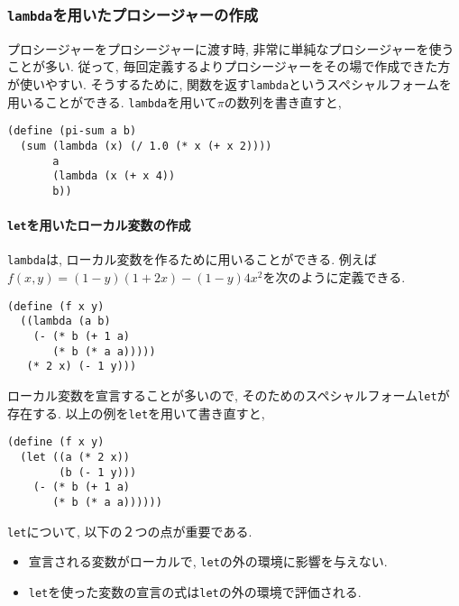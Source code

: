 \subsubsection{\lstinline{lambda}を用いたプロシージャーの作成}
プロシージャーをプロシージャーに渡す時, 非常に単純なプロシージャーを使うことが多い.
従って, 毎回定義するよりプロシージャーをその場で作成できた方が使いやすい.
そうするために, 関数を返す\lstinline{lambda}というスペシャルフォームを用いることができる.
\lstinline{lambda}を用いて$\pi$の数列を書き直すと,

\begin{lstlisting}[basicstyle=\footnotesize,title=一般的な和の関数と\lstinline{lambda}を用いた$\pi$の数列]
(define (pi-sum a b)
  (sum (lambda (x) (/ 1.0 (* x (+ x 2))))
       a
       (lambda (x (+ x 4))
       b))
\end{lstlisting}

\paragraph{\lstinline{let}を用いたローカル変数の作成} \lstinline{lambda}は,
ローカル変数を作るために用いることができる. 例えば$f(x,y) = (1-y)(1+2x) - (1-y)4x^2$を次のように定義できる.

\begin{lstlisting}[basicstyle=\footnotesize]
(define (f x y)
  ((lambda (a b)
    (- (* b (+ 1 a)
       (* b (* a a)))))
   (* 2 x) (- 1 y)))
\end{lstlisting}

ローカル変数を宣言することが多いので, そのためのスペシャルフォーム\lstinline{let}が存在する.
以上の例を\lstinline{let}を用いて書き直すと,

\begin{lstlisting}[basicstyle=\footnotesize]
(define (f x y)
  (let ((a (* 2 x))
        (b (- 1 y)))
    (- (* b (+ 1 a)
       (* b (* a a))))))
\end{lstlisting}

\lstinline{let}について, 以下の２つの点が重要である.

\begin{itemize}
\item 宣言される変数がローカルで, \lstinline{let}の外の環境に影響を与えない.
\item \lstinline{let}を使った変数の宣言の式は\lstinline{let}の外の環境で評価される.
\end{itemize}
